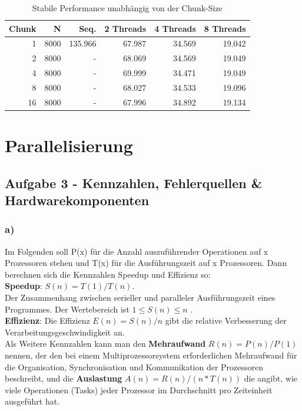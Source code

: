 \documentclass{report}
\begin{document}
			\begin{table}
				\centering
				\begin{tabular}{|r|r|r|r|r|r|}
					\hline
					Chunk & N & Seq. & 2 Threads & 4 Threads & 8 Threads \\
					\hline
					1 & 8000 & 135.966 & 67.987  & 34.569  & 19.042  \\
					\hline
					2 & 8000 & - & 68.069 & 34.569  & 19.049  \\
					\hline
					4 & 8000 & - & 69.999  & 34.471  & 19.049  \\
					\hline
					8 & 8000 & - & 68.027  & 34.533  & 19.096  \\
					\hline
					16 & 8000 & - & 67.996  & 34.892  & 19.134  \\
					\hline
				\end{tabular}
				\caption{Stabile Performance unabhängig von der Chunk-Size}
				\label{Table:2c2}
			\end{table}

\section{Parallelisierung}
    \subsection{Aufgabe 3 - Kennzahlen, Fehlerquellen \& Hardwarekomponenten}
    
        \subsubsection{a)}
        Im Folgenden soll P(x) für die Anzahl auszuführender Operationen auf x Prozessoren stehen und T(x) für die Ausführungszeit auf x Prozessoren. Dann berechnen sich die Kennzahlen Speedup und Effizienz so:\\
        
        \textbf{Speedup}:  $S(n) = T(1)/T(n) $. \\ Der Zusammenhang zwischen serieller und paralleler Ausführungszeit eines Programmes. Der Wertebereich ist $ 1 \leq S(n) \leq n $ .\\
        
        \textbf{Effizienz}: Die Effizienz $ E(n) = S(n)/n $ gibt die relative Verbesserung der Verarbeitungsgeschwindigkeit an.\\
        
        Als Weitere Kennzahlen kann man den \textbf{Mehraufwand} $R(n) = P(n)/P(1)$ nennen, der den bei einem Multiprozessorsystem erforderlichen Mehraufwand für die Organisation, Synchronisation und Kommunikation der Prozessoren beschreibt, und die \textbf{Auslastung} $ A(n) = R(n)/(n*T(n)) $ die angibt, wie viele Operationen (Tasks) jeder Prozessor im Durchschnitt pro Zeiteinheit ausgeführt hat.
        
\end{document}
